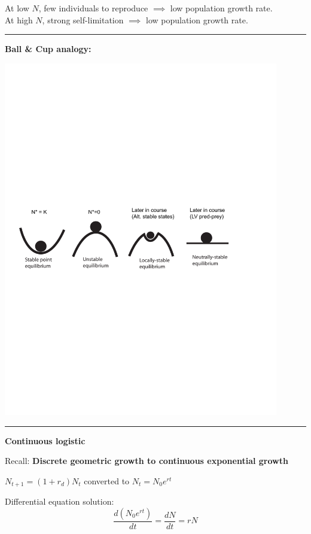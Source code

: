 \documentclass{article}
\begin{document}
At low $N$, few individuals to reproduce $\implies$ low population growth rate.\\
At high $N$, strong self-limitation $\implies$ low population growth rate.

\rule[0.5ex]{\linewidth}{1pt}

\textbf{Ball \& Cup analogy:}
\begin{center}
\includegraphics[width=12cm]{figs/ballcup.pdf}
\end{center}

\rule[0.5ex]{\linewidth}{1pt}

\textbf{Continuous logistic}

Recall: \textbf{Discrete geometric growth to continuous exponential growth}\\
\begin{center}
$N_{t+1}=(1+r_d)N_t$ converted to $N_t=N_0e^{rt}$\\
\end{center}
Differential equation solution:\\
\begin{equation*}
	\frac{d(N_0e^{rt})}{dt}=\frac{dN}{dt}=rN
\end{equation*}
\end{document}
